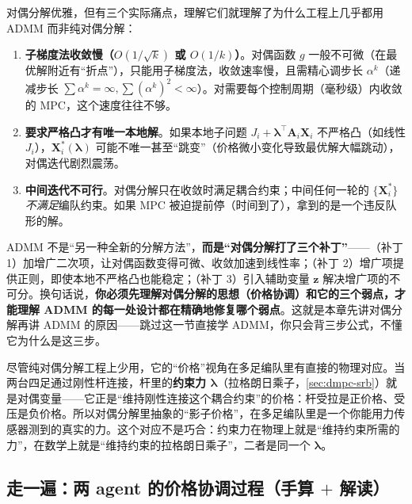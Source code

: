 对偶分解优雅，但有三个实际痛点，理解它们就理解了为什么工程上几乎都用 ADMM 而非纯对偶分解：
\begin{enumerate}
  \item \textbf{子梯度法收敛慢（$O(1/\sqrt{k})$ 或 $O(1/k)$）}。对偶函数 $g$ 一般不可微（在最优解附近有“折点”），只能用子梯度法，收敛速率慢，且需精心调步长 $\alpha^k$（递减步长 $\sum\alpha^k=\infty,\sum(\alpha^k)^2<\infty$）。对需要每个控制周期（毫秒级）内收敛的 MPC，这个速度往往不够。
  \item \textbf{要求严格凸才有唯一本地解}。如果本地子问题 $J_i+\boldsymbol{\lambda}^\top \mathbf{A}_i\mathbf{X}_i$ 不严格凸（如线性 $J_i$），$\mathbf{X}_i^*(\boldsymbol{\lambda})$ 可能不唯一甚至“跳变”（价格微小变化导致最优解大幅跳动），对偶迭代剧烈震荡。
  \item \textbf{中间迭代不可行}。对偶分解只在收敛时满足耦合约束；中间任何一轮的 $\{\mathbf{X}_i^*\}$ \emph{不满足}编队约束。如果 MPC 被迫提前停（时间到了），拿到的是一个违反队形的解。
\end{enumerate}

\begin{insight}\label{ins:dmpc-admm-patches}
ADMM 不是“另一种全新的分解方法”，\textbf{而是“对偶分解打了三个补丁”}——（补丁 1）加增广二次项，让对偶函数变得可微、收敛加速到线性率；（补丁 2）增广项提供正则，即使本地不严格凸也能稳定；（补丁 3）引入辅助变量 $\mathbf{z}$ 解决增广项的不可分。换句话说，\textbf{你必须先理解对偶分解的思想（价格协调）和它的三个弱点，才能理解 ADMM 的每一处设计都在精确地修复哪个弱点}。这就是本章先讲对偶分解再讲 ADMM 的原因——跳过这一节直接学 ADMM，你只会背三步公式，不懂它为什么是这三步。
\end{insight}

\begin{insight}[影子价格在多足里是可测的真实力]\label{ins:dmpc-shadow-force}
尽管纯对偶分解工程上少用，它的“价格”视角在多足编队里有直接的物理对应。当两台四足通过刚性杆连接，杆里的\textbf{约束力 $\boldsymbol{\lambda}$}（拉格朗日乘子，\cref{sec:dmpc-srb}）就是对偶变量——它正是“维持刚性连接这个耦合约束”的价格：杆受拉是正价格、受压是负价格。所以对偶分解里抽象的“影子价格”，在多足编队里是一个你能用力传感器测到的真实的力。这个对应不是巧合：约束力在物理上就是“维持约束所需的力”，在数学上就是“维持约束的拉格朗日乘子”，二者是同一个 $\boldsymbol{\lambda}$。
\end{insight}

\subsection{走一遍：两 agent 的价格协调过程（手算 $+$ 解读）}
\label{sec:dmpc-dual-example}

